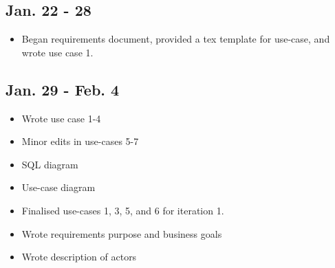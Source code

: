 \documentclass[12pt]{article}
\begin{document}
\maketitle

\subsection*{Jan. 22 - 28}

\begin{itemize}
    \item Began requirements document, provided a tex template for use-case, and wrote use case 1.
\end{itemize}

\subsection*{Jan. 29 - Feb. 4}

\begin{itemize}
    \item Wrote use case 1-4
    \item Minor edits in use-cases 5-7
    \item SQL diagram
    \item Use-case diagram
    \item Finalised use-cases 1, 3, 5, and 6 for iteration 1.
    \item Wrote requirements purpose and business goals
    \item Wrote description of actors
\end{itemize}
\end{document}
